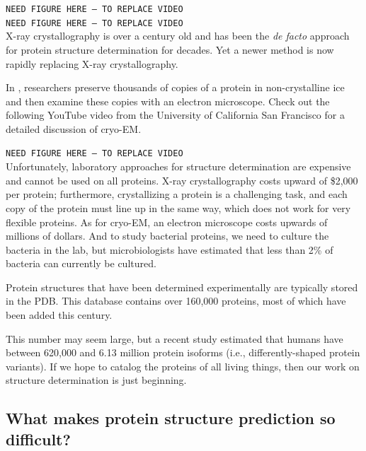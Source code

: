 \texttt{NEED FIGURE HERE -- TO REPLACE VIDEO}\\

\texttt{NEED FIGURE HERE -- TO REPLACE VIDEO}\\

X-ray crystallography is over a century old and has been the \textit{de facto} approach for protein structure determination for decades. Yet a newer method is now rapidly replacing X-ray crystallography.

In , researchers preserve thousands of copies of a protein in non-crystalline ice and then examine these copies with an electron microscope. Check out the following YouTube video from the University of California San Francisco for a detailed discussion of cryo-EM.

\texttt{NEED FIGURE HERE -- TO REPLACE VIDEO}\\

Unfortunately, laboratory approaches for structure determination are expensive and cannot be used on all proteins. X-ray crystallography costs upward of \$2,000 per protein; furthermore, crystallizing a protein is a challenging task, and each copy of the protein must line up in the same way, which does not work for very flexible proteins. As for cryo-EM, an electron microscope costs upwards of millions of dollars. And to study bacterial proteins, we need to culture the bacteria in the lab, but microbiologists have estimated that less than 2\% of bacteria can currently be cultured.

Protein structures that have been determined experimentally are typically stored in the PDB. This database contains over 160,000 proteins, most of which have been added this century.

This number may seem large, but a recent study estimated that humans have between 620,000 and 6.13 million protein isoforms (i.e., differently-shaped protein variants). If we hope to catalog the proteins of all living things, then our work on structure determination is just beginning.

\FloatBarrier
{}
\subsection{What makes protein structure prediction so difficult?}

